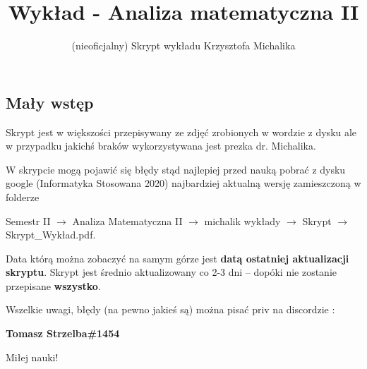 \documentclass[12pt]{article}
\author{(nieoficjalny) Skrypt wykładu Krzysztofa Michalika}
\title{Wykład - Analiza matematyczna II}
\begin{document}
\maketitle
\tableofcontents

\subsection{Mały wstęp}

Skrypt jest w większości przepisywany ze zdjęć zrobionych w wordzie z dysku ale w przypadku jakichś braków wykorzystywana jest
prezka dr. Michalika. 

W skrypcie mogą pojawić się błędy stąd najlepiej przed nauką pobrać z dysku google (Informatyka Stosowana 2020) najbardziej aktualną wersję
zamieszczoną w folderze 

Semestr II $\rightarrow$ Analiza Matematyczna II $\rightarrow$ michalik wykłady $\rightarrow$ Skrypt $\rightarrow$ Skrypt\_Wykład.pdf. 

Data którą można zobaczyć na samym górze jest \textbf{datą ostatniej aktualizacji skryptu}.
Skrypt jest średnio aktualizowany co 2-3 dni -- dopóki nie zostanie przepisane \textbf{wszystko}.

Wszelkie uwagi, błędy (na pewno jakieś są) można pisać priv na discordzie : 

\textbf{Tomasz Strzelba\#1454}

Miłej nauki!




\pagebreak


\pagebreak


\pagebreak


\pagebreak


\pagebreak


\pagebreak
\end{document}
